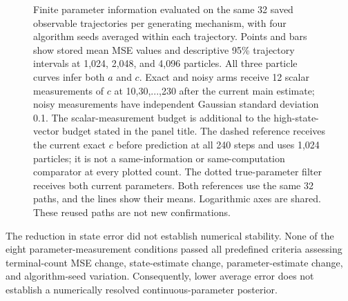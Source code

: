\documentclass[11pt,a4paper]{article}
\begin{document}
\begin{figure}[p]
\caption{Finite parameter information evaluated on the same 32 saved observable trajectories per generating mechanism, with four algorithm seeds averaged within each trajectory. Points and bars show stored mean MSE values and descriptive 95\% trajectory intervals at 1,024, 2,048, and 4,096 particles. All three particle curves infer both $a$ and $c$. Exact and noisy arms receive 12 scalar measurements of $c$ at 10,30,...,230 after the current main estimate; noisy measurements have independent Gaussian standard deviation 0.1. The scalar-measurement budget is additional to the high-state-vector budget stated in the panel title. The dashed reference receives the current exact $c$ before prediction at all 240 steps and uses 1,024 particles; it is not a same-information or same-computation comparator at every plotted count. The dotted true-parameter filter receives both current parameters. Both references use the same 32 paths, and the lines show their means. Logarithmic axes are shared. These reused paths are not new confirmations.}
\label{fig:dynamics-parameter-information}
\end{figure}

The reduction in state error did not establish numerical stability. None of the eight parameter-measurement conditions passed all predefined criteria assessing terminal-count MSE change, state-estimate change, parameter-estimate change, and algorithm-seed variation. Consequently, lower average error does not establish a numerically resolved continuous-parameter posterior.
\end{document}
